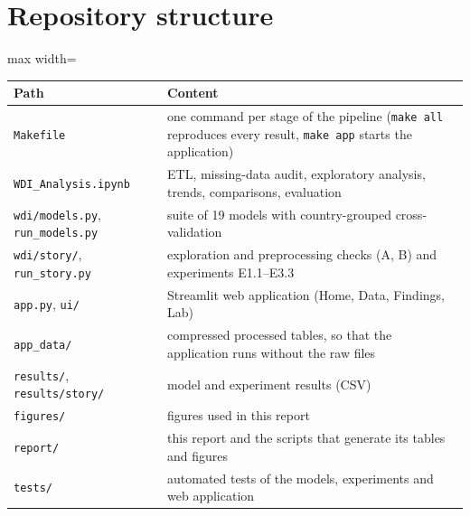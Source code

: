 \documentclass[11pt,a4paper]{article}
\begin{document}
\section{Repository structure}\label{app:repo}
\begin{adjustbox}{max width=\textwidth}\begin{tabular}{ll}
\toprule
Path & Content \\
\midrule
\texttt{Makefile} & one command per stage of the pipeline (\texttt{make all} reproduces every result, \texttt{make app} starts the application) \\
\texttt{WDI\_Analysis.ipynb} & ETL, missing-data audit, exploratory analysis, trends, comparisons, evaluation \\
\texttt{wdi/models.py}, \texttt{run\_models.py} & suite of 19 models with country-grouped cross-validation \\
\texttt{wdi/story/}, \texttt{run\_story.py} & exploration and preprocessing checks (A, B) and experiments E1.1--E3.3 \\
\texttt{app.py}, \texttt{ui/} & Streamlit web application (Home, Data, Findings, Lab) \\
\texttt{app\_data/} & compressed processed tables, so that the application runs without the raw files \\
\texttt{results/}, \texttt{results/story/} & model and experiment results (CSV) \\
\texttt{figures/} & figures used in this report \\
\texttt{report/} & this report and the scripts that generate its tables and figures \\
\texttt{tests/} & automated tests of the models, experiments and web application \\
\bottomrule
\end{tabular}\end{adjustbox}
\end{document}
